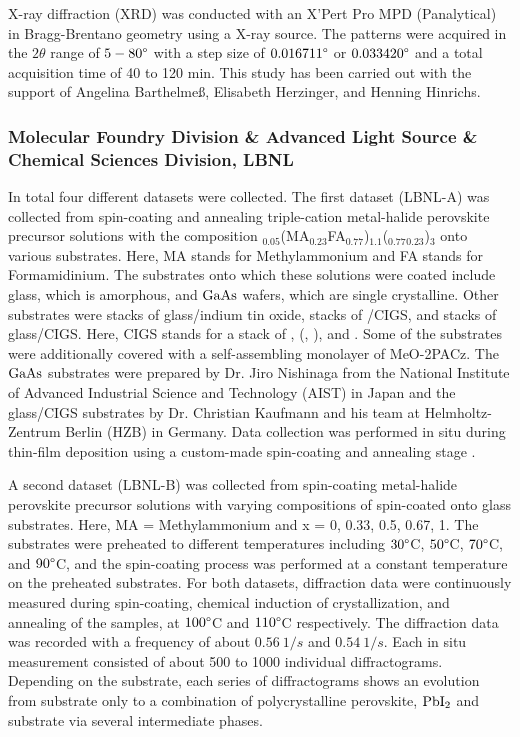 X-ray diffraction (XRD) was conducted with an X’Pert Pro MPD (Panalytical) in Bragg-Brentano geometry using a  X-ray source. The patterns were acquired in the $2\theta$ range of $5-80\degree$ with a step size of $0.016711\degree$ or $0.033420\degree$ and a total acquisition time of 40 to 120 min. This study has been carried out with the support of Angelina Barthelmeß, Elisabeth Herzinger, and Henning Hinrichs. \\

\subsubsection*{Molecular Foundry Division \& Advanced Light Source \& Chemical Sciences Division, LBNL}

In total four different datasets were collected. The first dataset (LBNL-A) was collected from spin-coating and annealing triple-cation metal-halide perovskite precursor solutions with the composition $_{0.05}$(MA$_{0.23}$FA$_{0.77}$)$_{1.1}$($_{0.77}$$_{0.23}$)$_{3}$ onto various substrates. Here, MA stands for Methylammonium and FA stands for Formamidinium. The substrates onto which these solutions were coated include glass, which is amorphous, and $\ce{GaAs}$ wafers, which are single crystalline. Other substrates were stacks of glass/indium tin oxide, stacks of /CIGS, and stacks of glass/CIGS. Here, CIGS stands for a stack of , (, ), and . Some of the substrates were additionally covered with a self-assembling monolayer of MeO-2PACz. The $\ce{GaAs}$ substrates were prepared by Dr. Jiro Nishinaga from the National Institute of Advanced Industrial Science and Technology (AIST) in Japan and the glass/CIGS substrates by Dr. Christian Kaufmann and his team at Helmholtz-Zentrum Berlin (HZB) in Germany. Data collection was performed in situ during thin-film deposition using a custom-made spin-coating and annealing stage \cite{song2019}. 

A second dataset (LBNL-B) was collected from spin-coating metal-halide perovskite precursor solutions with varying compositions of  spin-coated onto glass substrates. Here, MA = Methylammonium and x = 0, 0.33, 0.5, 0.67, 1. The substrates were preheated to different temperatures including $30\degree $C, $50\degree $C, $70\degree $C, and $90\degree $C, and the spin-coating process was performed at a constant temperature on the preheated substrates. For both datasets, diffraction data were continuously measured during spin-coating, chemical induction of crystallization, and annealing of the samples, at $100\degree$C and $110\degree$C respectively. The diffraction data was recorded with a frequency of about $0.56 
 \ 1/\si{s}$ and $0.54 \ 1/\si{s}$. Each in situ measurement consisted of about 500 to 1000 individual diffractograms. Depending on the substrate, each series of diffractograms shows an evolution from substrate only to a combination of polycrystalline perovskite, $\ce{PbI2}$ and substrate via several intermediate phases. \\


